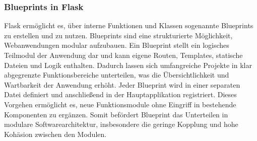 \subsubsection{Blueprints in Flask}

Flask ermöglicht es, über interne Funktionen und Klassen sogenannte Blueprints zu erstellen und zu nutzen.
Blueprints sind eine strukturierte Möglichkeit, Webanwendungen modular aufzubauen.
Ein Blueprint stellt ein logisches Teilmodul der Anwendung dar und kann eigene Routen, Templates, statische Dateien und Logik enthalten.
Dadurch lassen sich umfangreiche Projekte in klar abgegrenzte Funktionsbereiche unterteilen, was die Übersichtlichkeit und Wartbarkeit der Anwendung erhöht.
Jeder Blueprint wird in einer separaten Datei definiert und anschließend in der Hauptapplikation registriert.
Dieses Vorgehen ermöglicht es, neue Funktionsmodule ohne Eingriff in bestehende Komponenten zu ergänzen.
Somit befördert Blueprint das Unterteilen in modulare Softwarearchitektur, insbesondere die geringe Kopplung und hohe Kohäsion zwischen den Modulen.\cite{FlaskBlueprints}





